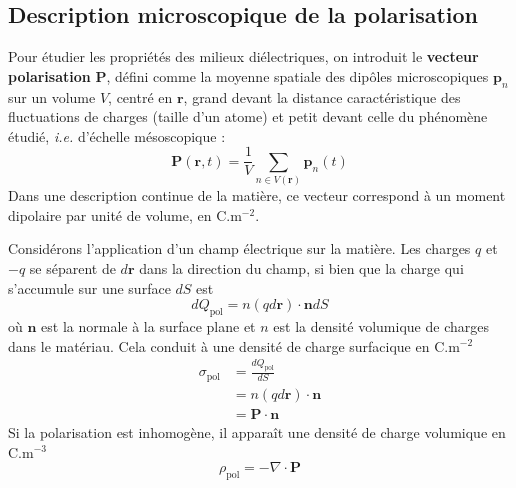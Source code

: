     \subsection{Description microscopique de la polarisation}

    Pour étudier les propriétés des milieux diélectriques, on introduit le \textbf{vecteur polarisation} $\mathbf{P}$, défini comme la moyenne spatiale des dipôles microscopiques $\mathbf{p}_n$ sur un volume $V$, centré en $\mathbf{r}$, grand devant la distance caractéristique des fluctuations de charges (taille d’un atome) et petit devant celle du phénomène étudié, \textit{i.e.} d’échelle mésoscopique :
    \begin{equation*}
        \mathbf{P}(\mathbf{r},t)=\frac{1}{V} \sum_{n \in V(\mathbf{r})} \mathbf{p}_n(t)
    \end{equation*}
    Dans une description continue de la matière, ce vecteur correspond à un moment dipolaire par unité de volume, en $\text{C}.\text{m}^{-2}$.

    Considérons l’application d’un champ électrique sur la matière. Les charges $q$ et $-q$ se séparent de $d\mathbf{r}$ dans la direction du champ, si bien que la charge qui s’accumule sur une surface $dS$ est 
    \[ dQ_{\text{pol}} = n (q d\mathbf{r}) \cdot \mathbf{n} dS \]   
    où $\mathbf{n}$ est la normale à la surface plane et $n$ est la densité volumique de charges dans le matériau. Cela conduit à une densité de charge surfacique en $\text{C}.\text{m}^{-2}$ 
    \begin{align*}
        \sigma_{\text{pol}} 
        &= \frac{d Q_{\text{pol}}}{dS} \\
        &= n(qd\mathbf{r})\cdot \mathbf{n} \\
        &= \mathbf{P} \cdot \mathbf{n} 
    \end{align*}
    Si la polarisation est inhomogène, il apparaît une densité de charge volumique en $\text{C}.\text{m}^{-3}$ 
    \[ \rho_{\text{pol}} = - \nabla \cdot \mathbf{P} \]   

